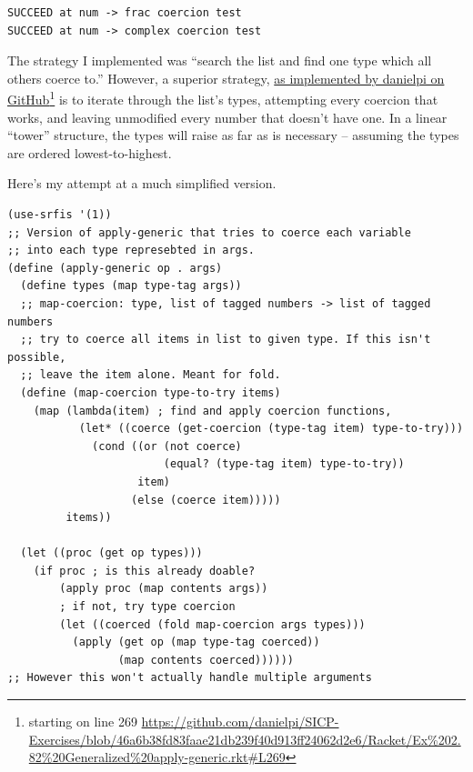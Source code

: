 \documentclass[final,fleqn,titlepage,twoside]{article}
\begin{document}
\begin{verbatim}
SUCCEED at num -> frac coercion test
SUCCEED at num -> complex coercion test
\end{verbatim}

The strategy I implemented was ``search the list and find one type which all
others coerce to.'' However, a superior strategy, \href{https://github.com/danielpi/SICP-Exercises/blob/46a6b38fd83faae21db239f40d913ff24062d2e6/Racket/Ex\%202.82\%20Generalized\%20apply-generic.rkt\#L269}{as implemented by danielpi on
GitHub}\footnote{starting on line 269
\url{https://github.com/danielpi/SICP-Exercises/blob/46a6b38fd83faae21db239f40d913ff24062d2e6/Racket/Ex\%202.82\%20Generalized\%20apply-generic.rkt\#L269}}
is to iterate through the list's types, attempting every coercion that works,
and leaving unmodified every number that doesn't have one. In a linear ``tower''
structure, the types will raise as far as is necessary -- assuming the types are
ordered lowest-to-highest.

Here's my attempt at a much simplified version. 

\begin{verbatim}
(use-srfis '(1))
;; Version of apply-generic that tries to coerce each variable
;; into each type represebted in args.
(define (apply-generic op . args)
  (define types (map type-tag args))
  ;; map-coercion: type, list of tagged numbers -> list of tagged numbers
  ;; try to coerce all items in list to given type. If this isn't possible,
  ;; leave the item alone. Meant for fold.
  (define (map-coercion type-to-try items)
    (map (lambda(item) ; find and apply coercion functions,
           (let* ((coerce (get-coercion (type-tag item) type-to-try)))
             (cond ((or (not coerce)
                        (equal? (type-tag item) type-to-try))
                    item)
                   (else (coerce item)))))
         items))
  
  (let ((proc (get op types)))
    (if proc ; is this already doable?
        (apply proc (map contents args))
        ; if not, try type coercion
        (let ((coerced (fold map-coercion args types)))
          (apply (get op (map type-tag coerced))
                 (map contents coerced))))))
;; However this won't actually handle multiple arguments
\end{verbatim}
\end{document}
